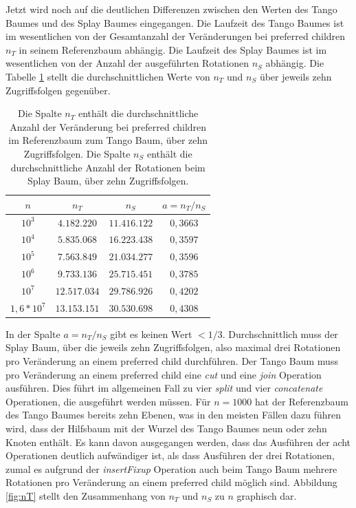 \documentclass[a4paper,12pt]{article}
\begin{document}
Jetzt wird noch auf die deutlichen Differenzen zwischen den Werten des Tango Baumes und des Splay Baumes eingegangen. Die Laufzeit des Tango Baumes ist im wesentlichen von der Gesamtanzahl der Veränderungen  bei preferred children $n_T$ in seinem Referenzbaum  abhängig. Die Laufzeit des Splay Baumes ist im wesentlichen von der Anzahl der ausgeführten Rotationen $n_S$ abhängig. Die Tabelle \ref{tab:Ran} stellt die durchschnittlichen Werte von $n_T$ und $n_S$ über jeweils zehn Zugriffsfolgen gegenüber.    
\begin{table}[H] 
	\begin{center}
		\begin{tabular}	[c]{|c|c|c|c|}  
			\hline
			$n$ & $n_T$ & $n_S$ & $a = n_T / n_S$\\
			\hline
			$10^3$ & $4.182.220$ &$11.416.122$ &$0,3663$\\
			\hline
			$10^4$  & $5.835.068$ &$16.223.438$&$0,3597$  \\
			\hline
			$10^5$  & $7.563.849$ &$21.034.277$ & $0,3596$\\
			\hline
			$10^6$  & $9.733.136$ &$25.715.451$ & $0,3785$\\
			\hline
			$10^7$  & $12.517.034$ &$29.786.926$ & $0,4202$\\
			\hline
			$1,6 * 10^7$  & $13.153.151$ &$30.530.698$ & $0,4308$ \\
			\hline
		\end{tabular}
		\caption{Die Spalte $n_T$ enthält die durchschnittliche Anzahl der Veränderung bei preferred children im Referenzbaum zum Tango Baum, über zehn Zugriffsfolgen. Die Spalte $n_S$ enthält die durchschnittliche Anzahl der Rotationen beim Splay Baum, über zehn Zugriffsfolgen.   }  
		\label{tab:Ran}
	\end{center}
\end{table}
\noindent In der Spalte $a = n_T / n_S$ gibt es  keinen Wert $< 1/3$. Durchschnittlich muss der Splay Baum, über die jeweils zehn Zugriffsfolgen, also maximal drei Rotationen pro Veränderung an einem preferred child durchführen. Der Tango Baum muss pro Veränderung an einem preferred child eine \textit{cut} und eine \textit{join} Operation ausführen. Dies führt im allgemeinen Fall zu vier \textit{split} und vier \textit{concatenate} Operationen,  die ausgeführt werden müssen. Für $n = 1000$ hat der Referenzbaum des Tango Baumes bereits zehn Ebenen, was in den meisten Fällen dazu führen wird, dass der Hilfsbaum mit der Wurzel des Tango Baumes neun oder zehn Knoten enthält. Es kann davon ausgegangen werden, dass das Ausführen der acht Operationen deutlich aufwändiger ist, als dass Ausführen der drei Rotationen, zumal es aufgrund der \textit{insertFixup} Operation auch beim Tango Baum mehrere Rotationen pro Veränderung an einem preferred child möglich sind. Abbildung \ref{fig:nT} stellt den Zusammenhang von $n_T$ und $n_S$ zu $n$ graphisch dar. 
\end{document}
